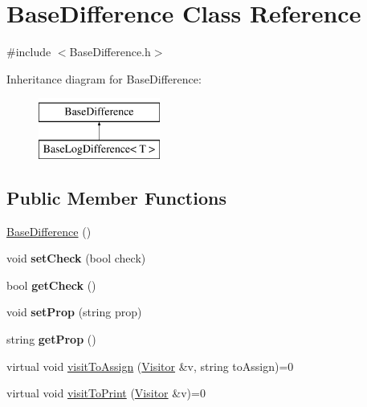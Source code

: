 \hypertarget{classBaseDifference}{}\section{Base\+Difference Class Reference}
\label{classBaseDifference}


{\ttfamily \#include $<$Base\+Difference.\+h$>$}

Inheritance diagram for Base\+Difference\+:\begin{figure}[H]
\begin{center}
\leavevmode
\includegraphics[height=2.000000cm]{classBaseDifference}
\end{center}
\end{figure}
\subsection*{Public Member Functions}
\begin{DoxyCompactItemize}
\item 
\hyperlink{classBaseDifference_ad9fe8c26c1ce15bc9e89bbfba57018af}{Base\+Difference} ()
\item 
void {\bfseries set\+Check} (bool check)\hypertarget{classBaseDifference_a2f942b77a94f991b25b5b7d610f1e827}{}\label{classBaseDifference_a2f942b77a94f991b25b5b7d610f1e827}

\item 
bool {\bfseries get\+Check} ()\hypertarget{classBaseDifference_a4fc53b0783ce154971468ae1e03bb1ec}{}\label{classBaseDifference_a4fc53b0783ce154971468ae1e03bb1ec}

\item 
void {\bfseries set\+Prop} (string prop)\hypertarget{classBaseDifference_a07199ac3c1cb1182caa73b2409608ea9}{}\label{classBaseDifference_a07199ac3c1cb1182caa73b2409608ea9}

\item 
string {\bfseries get\+Prop} ()\hypertarget{classBaseDifference_af8f73848d23d96034d2c326fbd258f2a}{}\label{classBaseDifference_af8f73848d23d96034d2c326fbd258f2a}

\item 
virtual void \hyperlink{classBaseDifference_ab369b45441dc65ae4346031872b70122}{visit\+To\+Assign} (\hyperlink{classVisitor}{Visitor} \&v, string to\+Assign)=0
\item 
virtual void \hyperlink{classBaseDifference_ab7a85a4a4ef9ef3a3e9abc97d3e19af4}{visit\+To\+Print} (\hyperlink{classVisitor}{Visitor} \&v)=0
\end{DoxyCompactItemize}
